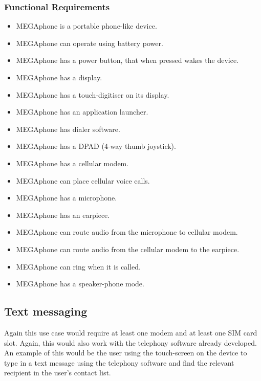         \subsubsection{Functional Requirements}
        \begin{itemize}
        \item MEGAphone is a portable phone-like device.
        \item MEGAphone can operate using battery power.
        \item MEGAphone has a power button, that when pressed wakes the device.
        \item MEGAphone has a display.
        \item MEGAphone has a touch-digitiser on its display.
        \item MEGAphone has an application launcher.
        \item MEGAphone has dialer software.
        \item MEGAphone has a DPAD (4-way thumb joystick).
        \item MEGAphone has a cellular modem.
        \item MEGAphone can place cellular voice calls.
        \item MEGAphone has a microphone.
        \item MEGAphone has an earpiece.
        \item MEGAphone can route audio from the microphone to cellular modem.
        \item MEGAphone can route audio from the cellular modem to the earpiece.
        \item MEGAphone can ring when it is called.
        \item MEGAphone has a speaker-phone mode.
        \end{itemize}
        
\subsection{Text messaging}
	Again this use case would require at least one modem and at least one SIM card slot. Again, this would also work with the telephony software already developed.\\
	An example of this would be the user using the touch-screen on the device to type in a text message using the telephony software and find the relevant recipient in the user's contact list.

